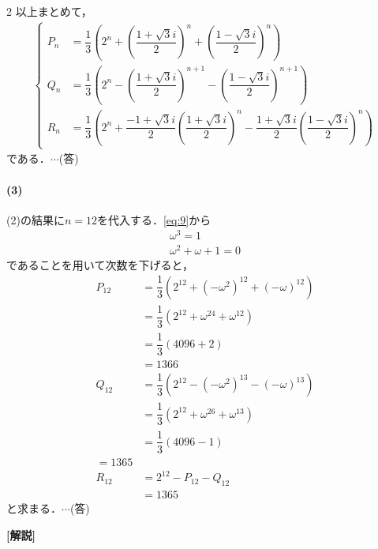 \documentclass[../../main.tex]{subfiles}
\begin{document}
\begin{multicols}{2}
  以上まとめて，
  \begin{align}
    \begin{cases}
      P_n & = \dfrac{1}{3}\left(2^n + \left(\dfrac{1+\sqrt{3}i}{2}\right)^n + \left(\dfrac{1-\sqrt{3}i}{2}\right)^n\right)                                            \\
      Q_n & = \dfrac{1}{3}\left(2^n - \left(\dfrac{1+\sqrt{3}i}{2}\right)^{n+1} - \left(\dfrac{1-\sqrt{3}i}{2}\right)^{n+1}\right)                                    \\
      R_n & = \dfrac{1}{3}\left(2^n + \dfrac{-1+\sqrt{3}i}{2}\left(\dfrac{1+\sqrt{3}i}{2}\right)^n - \dfrac{1+\sqrt{3}i}{2}\left(\dfrac{1-\sqrt{3}i}{2}\right)^n\right)
    \end{cases}
  \end{align}
  である．$\cdots$(答)

  \paragraph{(3)}
  (2)の結果に$n=12$を代入する．\cref{eq:9}から
  \begin{align}
    \omega^3 = 1 \\
    \omega^2+\omega+1 = 0
  \end{align}
  であることを用いて次数を下げると，
  \begin{align}
    P_{12}
    & = \dfrac{1}{3}\left(2^{12} + (-\omega^2)^{12} + (-\omega)^{12}\right) \\
    & = \dfrac{1}{3}\left(2^{12} + \omega^{24} + \omega^{12}\right)         \\
    & = \dfrac{1}{3}\left(4096 + 2\right)                                   \\
    & = 1366                                                               \\
    Q_{12}
    & = \dfrac{1}{3}\left(2^{12} - (-\omega^2)^{13} - (-\omega)^{13}\right) \\
    & = \dfrac{1}{3}\left(2^{12} + \omega^{26} + \omega^{13}\right)         \\
    & = \dfrac{1}{3}\left(4096 - 1\right)                                   \\
    = 1365                                                                  \\
    R_{12}
    & = 2^{12} - P_{12} - Q_{12}                                           \\
    & = 1365
  \end{align}
  と求まる．$\cdots$(答)

  {\bf [解説]}

  \newpage
\end{multicols}
\end{document}
